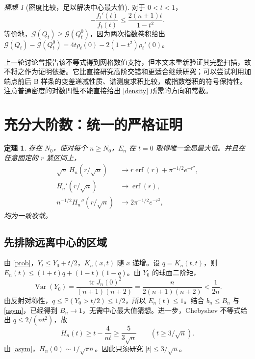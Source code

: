 \documentclass[11pt,a4paper,fontset=fandol]{ctexart}
\newcommand{\Prob}{\mathbb P}
\newcommand{\tr}{\operatorname{tr}}
\newcommand{\G}{\mathcal G}
\newtheorem{theorem}{定理}
\theoremstyle{remark}\newtheorem{conjecture}{猜想}
\begin{document}
\begin{conjecture}[密度比较，足以解决中心最大值]\label{conj:density}
对于 $0<t<1$，
\begin{equation}\label{density}
 -\frac{f_t'(t)}{f_t(t)}\le\frac{2(n+1)t}{1-t^2}.
\end{equation}
等价地，$\G(Q_t)\ge\G(Q_t^0)$，因为两次指数卷积给出 $\G(Q_t)-\G(Q_t^0)=4t\rho_t(0)-2(1-t^2)\rho_t'(0)$。
\end{conjecture}
上一轮讨论曾报告该不等式得到网格数值支持，但本文未重新验证其完整扫描，故不将之作为证明依据。它比直接研究高阶交错和更适合继续研究；可以尝试利用加端点前后 B 样条的变差递减性质、谱测度求积比较，或指数卷积的符号保持性。注意普通密度的对数凹性不能直接给出 \eqref{density} 所需的方向和常数。

\section{充分大阶数：统一的严格证明}\label{sec:large}
\begin{theorem}\label{thm:large}
存在 $N_0$，使对每个 $n\ge N_0$，$E_n$ 在 $t=0$ 取得唯一全局最大值。并且在任意固定的 $r$ 紧区间上，
\begin{align*}
 \sqrt n\,H_n(r/\sqrt n)&\longrightarrow r\operatorname{erf}(r)+\pi^{-1/2}e^{-r^2},\\
 H_n'(r/\sqrt n)&\longrightarrow\operatorname{erf}(r),\\
 n^{-1/2}H_n''(r/\sqrt n)&\longrightarrow 2\pi^{-1/2}e^{-r^2},
\end{align*}
均为一致收敛。
\end{theorem}
\subsection{先排除远离中心的区域}
由 \eqref{prob}，$Y_t\le Y_0+t/2$，$K_n(x,t)$ 随 $x$ 递增。设 $q=K_n(t,t)$，则 $E_n(t)\le(1+t)q+(1-t)(1-q)$。由 $Y_0$ 的球面二阶矩，
\[
 \operatorname{Var}(Y_0)=\frac{\tr J_n(0)^2}{(n+1)(n+2)}=\frac{n}{2(n+1)(n+2)}<\frac1{2n}.
\]
由反射对称性，$q\le\Prob(Y_0>t/2)\le1/2$，所以 $E_n(t)\le1$。结合 $b_n\le B_n$ 与 \eqref{asym}，已经得到 $B_n\to1$，无需中心最大值猜想。进一步，Chebyshev 不等式给出 $q\le2/(nt^2)$，故
\begin{equation}\label{outer}
 H_n(t)\ge t-\frac4{nt}\ge\frac5{3\sqrt n}\qquad(t\ge3/\sqrt n).
\end{equation}
由 \eqref{asym}，$H_n(0)\sim1/\sqrt{\pi n}$。因此只须研究 $|t|\le3/\sqrt n$。
\end{document}
